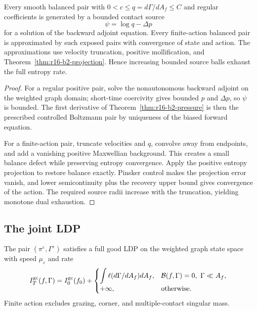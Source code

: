 \begin{theorem}
\label{thm:r16-b2-exposure}
Every smooth balanced pair with
\(0<c\le q=d\Gamma/dA_f\le C\) and regular coefficients is generated by a
bounded contact source
\[
 \psi=\log q-\Delta p
\]
for a solution of the backward adjoint equation.  Every finite-action balanced
pair is approximated by such exposed pairs with convergence of state and
action.  The approximations use velocity truncation, positive mollification,
and Theorem~\ref{thm:r16-b2-projection}.  Hence increasing bounded source
balls exhaust the full entropy rate.
\end{theorem}

\begin{proof}
For a regular positive pair, solve the nonautonomous backward adjoint on the
weighted graph domain; short-time coercivity gives bounded \(p\) and
\(\Delta p\), so \(\psi\) is bounded.  The first derivative of
Theorem~\ref{thm:r16-b2-pressure} is then the prescribed controlled Boltzmann
pair by uniqueness of the biased forward equation.

For a finite-action pair, truncate velocities and \(q\), convolve away from
endpoints, and add a vanishing positive Maxwellian background.  This creates a
small balance defect while preserving entropy convergence.  Apply the positive
entropy projection to restore balance exactly.  Pinsker control makes the
projection error vanish, and lower semicontinuity plus the recovery upper
bound gives convergence of the action.  The required source radii increase
with the truncation, yielding monotone dual exhaustion.
\end{proof}

\subsection{The joint LDP}

\begin{theorem}
\label{thm:r16-b2-gc-ldp}
The pair \((\pi^\varepsilon,\Gamma^\varepsilon)\) satisfies a full good LDP on
the weighted graph state space with speed \(\mu_\varepsilon\) and rate
\[
 I_T^{\rm gc}(f,\Gamma)
 =I_0^{\rm gc}(f_0)+
 \begin{cases}
 \displaystyle\int\ell(d\Gamma/dA_f)dA_f,
 &\mathcal B(f,\Gamma)=0,
 \ \Gamma\ll A_f,\\
 +\infty,&\text{otherwise}.
 \end{cases}
\]
Finite action excludes grazing, corner, and multiple-contact singular mass.
\end{theorem}

